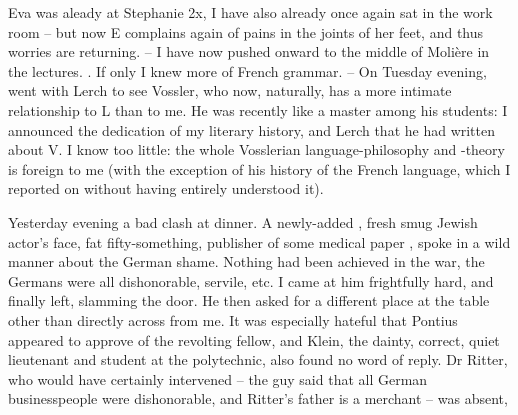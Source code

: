 
Eva was aleady at Stephanie 2x,  I have also already once again sat in the work room -- but now E complains again of pains in the joints of her feet, and thus worries are returning. -- I have now pushed onward to the middle of Molière in the lectures. . If only I knew more of French grammar. -- On Tuesday evening, went with Lerch to see Vossler, who now, naturally, has a more intimate relationship to L than to me. He was recently like a master among his students: I announced the dedication of my literary history, and Lerch  that he had written about V. I know too little: the whole Vosslerian language-philosophy and -theory is foreign to me (with the exception of his history of the French language, which I reported on without having entirely understood it).

Yesterday evening a bad clash at dinner. A newly-added , fresh smug Jewish actor's face, fat fifty-something, publisher of some medical paper , spoke in a wild manner about the German shame. Nothing had been achieved in the war, the Germans were all dishonorable, servile, etc. I came at him frightfully hard, and finally left, slamming the door. He then asked for a different place at the table other than directly across from me. It was especially hateful that Pontius appeared to approve of the revolting fellow, and Klein, the dainty, correct, quiet lieutenant and student at the polytechnic, also found no word of reply. Dr Ritter, who would have certainly intervened -- the guy said that all German businesspeople were dishonorable, and Ritter's father is a merchant -- was absent,